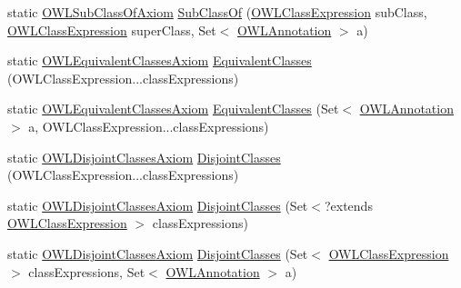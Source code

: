 \begin{DoxyCompactItemize}
\item 
static \hyperlink{interfaceorg_1_1semanticweb_1_1owlapi_1_1model_1_1_o_w_l_sub_class_of_axiom}{O\-W\-L\-Sub\-Class\-Of\-Axiom} \hyperlink{classorg_1_1semanticweb_1_1owlapi_1_1apibinding_1_1_o_w_l_functional_syntax_factory_a79d7ca0bd752f0c142b26762257f859e}{Sub\-Class\-Of} (\hyperlink{interfaceorg_1_1semanticweb_1_1owlapi_1_1model_1_1_o_w_l_class_expression}{O\-W\-L\-Class\-Expression} sub\-Class, \hyperlink{interfaceorg_1_1semanticweb_1_1owlapi_1_1model_1_1_o_w_l_class_expression}{O\-W\-L\-Class\-Expression} super\-Class, Set$<$ \hyperlink{interfaceorg_1_1semanticweb_1_1owlapi_1_1model_1_1_o_w_l_annotation}{O\-W\-L\-Annotation} $>$ a)
\item 
static \hyperlink{interfaceorg_1_1semanticweb_1_1owlapi_1_1model_1_1_o_w_l_equivalent_classes_axiom}{O\-W\-L\-Equivalent\-Classes\-Axiom} \hyperlink{classorg_1_1semanticweb_1_1owlapi_1_1apibinding_1_1_o_w_l_functional_syntax_factory_ad8231a0a5f711b9a4a8b9898912b31fa}{Equivalent\-Classes} (O\-W\-L\-Class\-Expression...\-class\-Expressions)
\item 
static \hyperlink{interfaceorg_1_1semanticweb_1_1owlapi_1_1model_1_1_o_w_l_equivalent_classes_axiom}{O\-W\-L\-Equivalent\-Classes\-Axiom} \hyperlink{classorg_1_1semanticweb_1_1owlapi_1_1apibinding_1_1_o_w_l_functional_syntax_factory_a0b6ef0d3df814ebf4429564ebae881c2}{Equivalent\-Classes} (Set$<$ \hyperlink{interfaceorg_1_1semanticweb_1_1owlapi_1_1model_1_1_o_w_l_annotation}{O\-W\-L\-Annotation} $>$ a, O\-W\-L\-Class\-Expression...\-class\-Expressions)
\item 
static \hyperlink{interfaceorg_1_1semanticweb_1_1owlapi_1_1model_1_1_o_w_l_disjoint_classes_axiom}{O\-W\-L\-Disjoint\-Classes\-Axiom} \hyperlink{classorg_1_1semanticweb_1_1owlapi_1_1apibinding_1_1_o_w_l_functional_syntax_factory_aa254825018e092e910aee5388e48b764}{Disjoint\-Classes} (O\-W\-L\-Class\-Expression...\-class\-Expressions)
\item 
static \hyperlink{interfaceorg_1_1semanticweb_1_1owlapi_1_1model_1_1_o_w_l_disjoint_classes_axiom}{O\-W\-L\-Disjoint\-Classes\-Axiom} \hyperlink{classorg_1_1semanticweb_1_1owlapi_1_1apibinding_1_1_o_w_l_functional_syntax_factory_ad08b91108010e13393568575a37d9d07}{Disjoint\-Classes} (Set$<$?extends \hyperlink{interfaceorg_1_1semanticweb_1_1owlapi_1_1model_1_1_o_w_l_class_expression}{O\-W\-L\-Class\-Expression} $>$ class\-Expressions)
\item 
static \hyperlink{interfaceorg_1_1semanticweb_1_1owlapi_1_1model_1_1_o_w_l_disjoint_classes_axiom}{O\-W\-L\-Disjoint\-Classes\-Axiom} \hyperlink{classorg_1_1semanticweb_1_1owlapi_1_1apibinding_1_1_o_w_l_functional_syntax_factory_aa1a0a31f9c7b2a1f1551d28e0eda520b}{Disjoint\-Classes} (Set$<$ \hyperlink{interfaceorg_1_1semanticweb_1_1owlapi_1_1model_1_1_o_w_l_class_expression}{O\-W\-L\-Class\-Expression} $>$ class\-Expressions, Set$<$ \hyperlink{interfaceorg_1_1semanticweb_1_1owlapi_1_1model_1_1_o_w_l_annotation}{O\-W\-L\-Annotation} $>$ a)

\end{DoxyCompactItemize}
